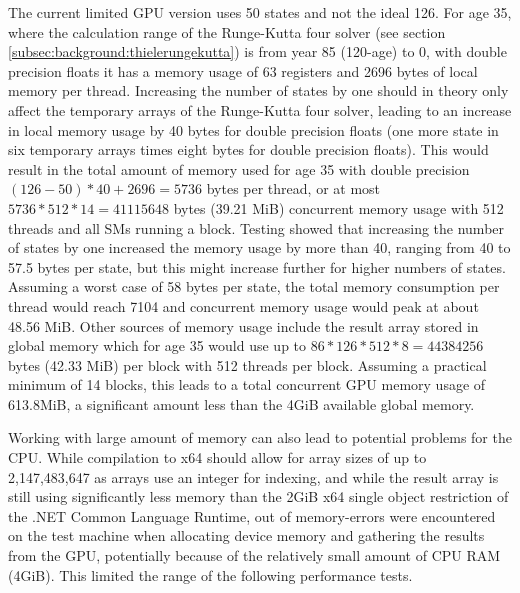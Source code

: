The current limited GPU version uses 50 states and not the ideal 126.
For age 35, where the calculation range of the Runge-Kutta four solver (see section \ref{subsec:background:thielerungekutta}) is from year 85 (120-age) to 0, with double precision floats it has a memory usage of 63 registers and 2696 bytes of local memory per thread.
Increasing the number of states by one should in theory only affect the temporary arrays of the Runge-Kutta four solver, leading to an increase in local memory usage by 40 bytes for double precision floats (one more state in six temporary arrays times eight bytes for double precision floats).
This would result in the total amount of memory used for age 35 with double precision $(126 - 50) * 40 + 2696 = 5736$ bytes per thread, or at most $5736 * 512 * 14 = 41115648$ bytes (39.21 MiB) concurrent memory usage with 512 threads and all SMs running a block.
Testing showed that increasing the number of states by one increased the memory usage by more than 40, ranging from 40 to 57.5 bytes per state, but this might increase further for higher numbers of states.
Assuming a worst case of 58 bytes per state, the total memory consumption per thread would reach 7104 and concurrent memory usage would peak at about 48.56 MiB.
Other sources of memory usage include the result array stored in global memory which for age 35 would use up to $86 * 126 * 512 * 8 = 44384256$ bytes (42.33 MiB) per block with 512 threads per block.
Assuming a practical minimum of 14 blocks, this leads to a total concurrent GPU memory usage of 613.8MiB, a significant amount less than the 4GiB available global memory.

Working with large amount of memory can also lead to potential problems for the CPU.
While compilation to x64 should allow for array sizes of up to 2,147,483,647 as arrays use an integer for indexing, and while the result array is still using significantly less memory than the 2GiB x64 single object restriction of the .NET Common Language Runtime, out of memory-errors were encountered on the test machine when allocating device memory and gathering the results from the GPU, potentially because of the relatively small amount of CPU RAM (4GiB).
This limited the range of the following performance tests.

